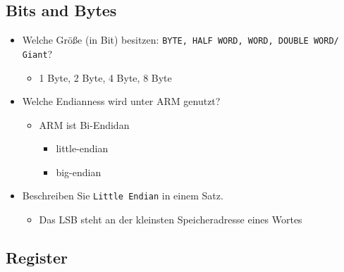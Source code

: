 \documentclass[12pt]{article}
\begin{document}
\subsection{Bits and Bytes}

\begin{itemize}
    \item Welche Größe (in Bit) besitzen: \texttt{BYTE, HALF WORD, WORD, DOUBLE
        WORD/ Giant}?
        \begin{itemize}
            \item 1 Byte, 2 Byte, 4 Byte, 8 Byte
        \end{itemize}
    \item Welche Endianness wird unter ARM genutzt?
        \begin{itemize}
            \item ARM ist Bi-Endidan
                \begin{itemize}
                    \item little-endian
                    \item big-endian
                \end{itemize}
        \end{itemize}
    \item Beschreiben Sie \texttt{Little Endian} in einem Satz.
        \begin{itemize}
            \item Das LSB steht an der kleinsten Speicheradresse eines Wortes
        \end{itemize}

\end{itemize}

\subsection{Register}
\end{document}
